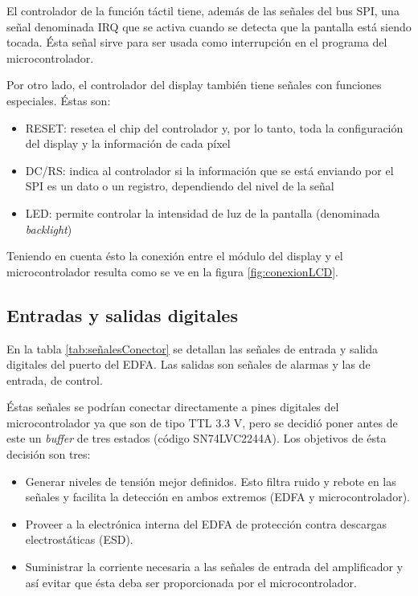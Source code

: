 El controlador de la función táctil tiene, además de las señales del bus SPI, una señal denominada IRQ que se activa cuando se detecta que la pantalla está siendo tocada. Ésta señal sirve para ser usada como interrupción en el programa del microcontrolador.

Por otro lado, el controlador del display también tiene señales con funciones especiales. Éstas son:

\begin{itemize}
\item RESET: resetea el chip del controlador y, por lo tanto, toda la configuración del display y la información de cada píxel
\item DC/RS: indica al controlador si la información que se está enviando por el SPI es un dato o un registro, dependiendo del nivel de la señal
\item LED: permite controlar la intensidad de luz de la pantalla (denominada \textit{backlight})
\end{itemize}

Teniendo en cuenta ésto la conexión entre el módulo del display y el microcontrolador resulta como se ve en la figura \ref{fig:conexionLCD}.


\subsection{Entradas y salidas digitales}

En la tabla \ref{tab:señalesConector} se detallan las señales de entrada y salida digitales del puerto del EDFA. Las salidas son señales de alarmas y las de entrada, de control.

Éstas señales se podrían conectar directamente a pines digitales del microcontrolador ya que son de tipo TTL 3.3 V, pero se decidió poner antes de este un \textit{buffer} de tres estados (código SN74LVC2244A). Los objetivos de ésta decisión son tres:

\begin{itemize}
\item Generar niveles de tensión mejor definidos. Esto filtra ruido y rebote en las señales y facilita la detección en ambos extremos (EDFA y microcontrolador).
\item Proveer a la electrónica interna del EDFA de protección contra descargas electrostáticas (ESD).
\item Suministrar la corriente necesaria a las señales de entrada del amplificador y así evitar que ésta deba ser proporcionada por el microcontrolador.
\end{itemize}

